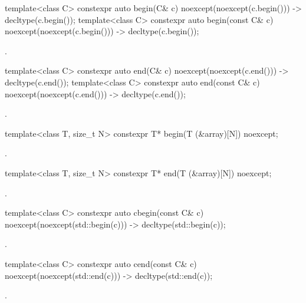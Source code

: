 %
\begin{itemdecl}
template<class C> constexpr auto begin(C& c) noexcept(noexcept(c.begin()))
  -> decltype(c.begin());
template<class C> constexpr auto begin(const C& c) noexcept(noexcept(c.begin()))
  -> decltype(c.begin());
\end{itemdecl}

\begin{itemdescr}
\pnum
\returns
{}.
\end{itemdescr}

%
\begin{itemdecl}
template<class C> constexpr auto end(C& c) noexcept(noexcept(c.end())) -> decltype(c.end());
template<class C> constexpr auto end(const C& c) noexcept(noexcept(c.end())) -> decltype(c.end());
\end{itemdecl}

\begin{itemdescr}
\pnum
\returns
{}.
\end{itemdescr}

%
\begin{itemdecl}
template<class T, size_t N> constexpr T* begin(T (&array)[N]) noexcept;
\end{itemdecl}

\begin{itemdescr}
\pnum
\returns
{}.
\end{itemdescr}

%
\begin{itemdecl}
template<class T, size_t N> constexpr T* end(T (&array)[N]) noexcept;
\end{itemdecl}

\begin{itemdescr}
\pnum
\returns
{}.
\end{itemdescr}

%
\begin{itemdecl}
template<class C> constexpr auto cbegin(const C& c) noexcept(noexcept(std::begin(c)))
  -> decltype(std::begin(c));
\end{itemdecl}
\begin{itemdescr}
\pnum
\returns
{}.
\end{itemdescr}

%
\begin{itemdecl}
template<class C> constexpr auto cend(const C& c) noexcept(noexcept(std::end(c)))
  -> decltype(std::end(c));
\end{itemdecl}
\begin{itemdescr}
\pnum
\returns
{}.
\end{itemdescr}

